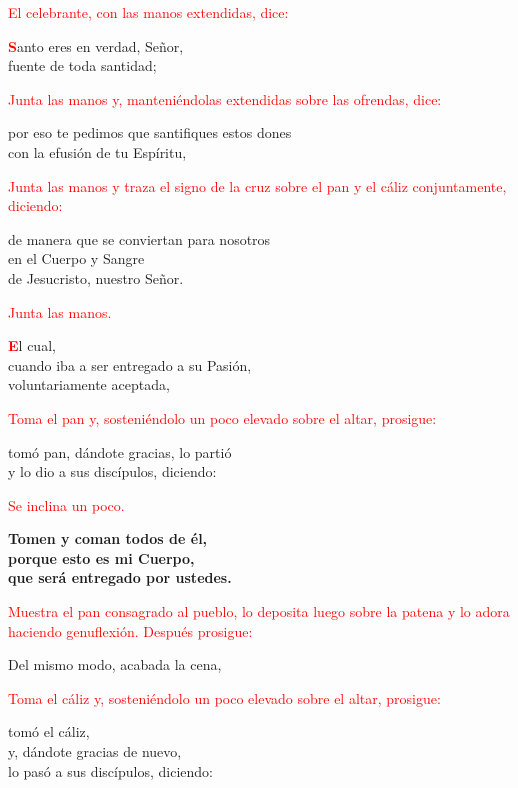 \documentclass[12pt, letterpaper]{report}
\begin{document}
\large{\textcolor{red}{El celebrante, con las manos extendidas, dice:}}

\lettrine[lines=1]{\bfseries \textcolor{red}{S}}{}\Large anto eres en verdad, Se\~nor,\\
fuente de toda santidad;

\large{\textcolor{red}{Junta las manos y, manteni\'endolas extendidas sobre las ofrendas, dice:}}

\noindent
\Large por eso te pedimos que santifiques estos dones\\
con la efusi\'on de tu Esp\'iritu,

\large{\textcolor{red}{Junta las manos y traza el signo de la cruz sobre el pan y el c\'aliz conjuntamente, diciendo:}}

\noindent
\Large de manera que se conviertan para nosotros\\
en el Cuerpo y \Huge{\textcolor{red}{}} \Large Sangre\\
de Jesucristo, nuestro Se\~nor.

\large{\textcolor{red}{Junta las manos.}}

\lettrine[lines=1]{\bfseries \textcolor{red}{E}}{}\Large l cual,\\
cuando iba a ser entregado a su Pasi\'on,\\
voluntariamente aceptada,

\large{\textcolor{red}{Toma el pan y, sosteni\'endolo un poco elevado sobre el altar, prosigue:}}

\noindent
\Large tom\'o pan, d\'andote gracias, lo parti\'o\\
y lo dio a sus disc\'ipulos, diciendo:

\large{\textcolor{red}{Se inclina un poco.}} 

\noindent
\LARGE{ \bfseries{ Tomen y coman todos de \'el,\\
porque esto es mi Cuerpo,\\
que ser\'a entregado por ustedes.}}

\large{\textcolor{red}{Muestra el pan consagrado al pueblo, lo deposita luego sobre la patena y lo adora haciendo genuflexi\'on. Despu\'es prosigue:}}

\noindent
\Large Del mismo modo, acabada la cena,

\large{\textcolor{red}{Toma el c\'aliz y, sosteni\'endolo un poco elevado sobre el altar, prosigue:}}

\noindent
\Large tom\'o el c\'aliz,\\
y, d\'andote gracias de nuevo,\\
lo pas\'o a sus disc\'ipulos, diciendo:
\end{document}
